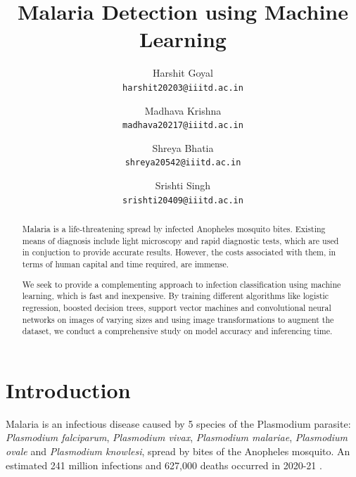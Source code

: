 \documentclass[10pt,twocolumn,letterpaper]{article}
\begin{document}
\title{Malaria Detection using Machine Learning}

\author{Harshit Goyal\\
{\tt\small harshit20203@iiitd.ac.in}
\and
Madhava Krishna\\
{\tt\small madhava20217@iiitd.ac.in}
\and
Shreya Bhatia\\
{\tt\small shreya20542@iiitd.ac.in}
\and
Srishti Singh\\
{\tt\small srishti20409@iiitd.ac.in}
}

\maketitle

\begin{abstract}
   Malaria is a life-threatening spread by infected Anopheles mosquito bites. Existing means of diagnosis include light microscopy and rapid diagnostic tests, which are used in conjuction to provide accurate results. However, the costs associated with them, in terms of human capital and time required, are immense.
   
   We seek to provide a complementing approach to infection classification using machine learning, which is fast and inexpensive. By training different algorithms like logistic regression, boosted decision trees, support vector machines and convolutional neural networks on images of varying sizes and using image transformations to augment the dataset, we conduct a comprehensive study on model accuracy and inferencing time.
\end{abstract}

\section{Introduction}

Malaria is an infectious disease caused by 5 species of the Plasmodium parasite: \textit{Plasmodium falciparum}, \textit{Plasmodium vivax}, \textit{Plasmodium malariae}, \textit{Plasmodium ovale} and \textit{Plasmodium knowlesi}, spread by bites of the Anopheles mosquito. An estimated 241 million infections and 627,000 deaths occurred in 2020-21 \cite{worldmalaria}. 
\end{document}

